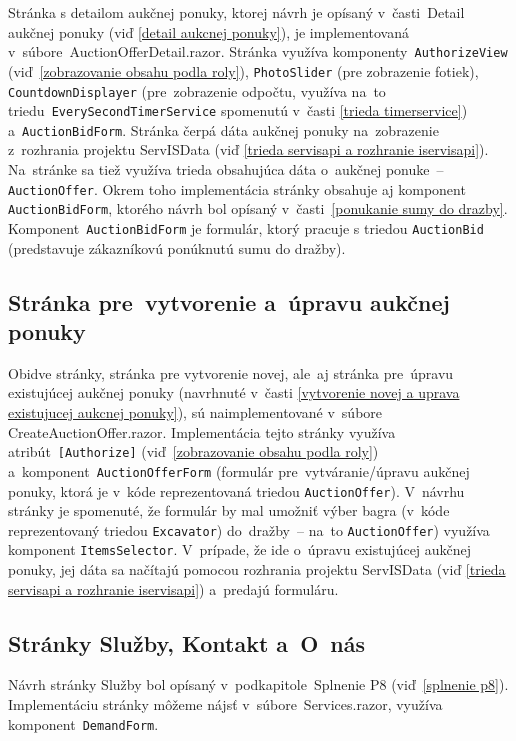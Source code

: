 Stránka s detailom aukčnej ponuky, ktorej návrh je opísaný v~časti~Detail aukčnej ponuky (viď \ref{detail aukcnej ponuky}), je implementovaná v~súbore~AuctionOfferDetail.razor. Stránka využíva komponenty~\verb|AuthorizeView| (viď~\ref{zobrazovanie obsahu podla roly}), \verb|PhotoSlider| (pre zobrazenie fotiek), \verb|CountdownDisplayer| (pre~zobrazenie odpočtu, využíva na~to triedu~\verb|EverySecondTimerService| spomenutú v~časti \ref{trieda timerservice}) a~\verb|AuctionBidForm|. Stránka čerpá dáta aukčnej ponuky na~zobrazenie z~rozhrania projektu ServISData (viď \ref{trieda servisapi a rozhranie iservisapi}). Na~stránke sa tiež využíva trieda obsahujúca dáta o~aukčnej ponuke~-- \verb|AuctionOffer|. Okrem toho implementácia stránky obsahuje aj komponent \verb|AuctionBidForm|, ktorého návrh bol opísaný v~časti~\ref{ponukanie sumy do drazby}. Komponent~\verb|AuctionBidForm| je formulár, ktorý pracuje s triedou \verb|AuctionBid| (predstavuje zákazníkovú ponúknutú sumu do dražby).

\subsection{Stránka pre~vytvorenie a~úpravu aukčnej ponuky}

Obidve stránky, stránka pre vytvorenie novej, ale~aj stránka pre~úpravu existujúcej aukčnej ponuky (navrhnuté v~časti \ref{vytvorenie novej a uprava existujucej aukcnej ponuky}), sú naimplementované v~súbore CreateAuctionOffer.razor. Implementácia tejto stránky využíva atribút~\verb|[Authorize]| (viď~\ref{zobrazovanie obsahu podla roly}) a~komponent~\verb|AuctionOfferForm| (formulár pre~vytváranie/úpravu aukčnej ponuky, ktorá je v~kóde reprezentovaná triedou \verb|AuctionOffer|). V~návrhu stránky je spomenuté, že formulár by mal umožniť výber bagra (v~kóde reprezentovaný triedou \verb|Excavator|) do~dražby~-- na~to \verb|AuctionOffer|) využíva komponent \verb|ItemsSelector|. V~prípade, že ide o~úpravu existujúcej aukčnej ponuky, jej dáta sa načítajú pomocou rozhrania projektu ServISData (viď \ref{trieda servisapi a rozhranie iservisapi}) a~predajú formuláru.

\subsection{Stránky Služby, Kontakt a~O~nás}

Návrh stránky Služby bol opísaný v~podkapitole~Splnenie P8 (viď~\ref{splnenie p8}). Implementáciu stránky môžeme nájsť v~súbore~Services.razor, využíva komponent~\verb|DemandForm|.

